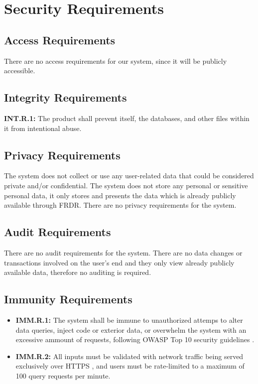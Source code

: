\documentclass[12pt]{article}
\begin{document}
\section{Security Requirements}
\subsection{Access Requirements}

\par{There are no access requirements for our system, since it will be publicly accessible.}

\subsection{Integrity Requirements}

\par{\textbf{INT.R.1:}\label{req:int.r.1} The product shall prevent itself, the databases, and other files within it from intentional abuse.}

\subsection{Privacy Requirements}

\par{The system does not collect or use any user-related data that could be considered private and/or confidential. \newline \indent
The system does not store any personal or sensitive personal data, it only stores and presents the data which is already 
publicly available through FRDR. \newline \indent There are no privacy requirements for the system.}

\subsection{Audit Requirements}

\par{There are no audit requirements for the system. There are no data changes or transactions involved on the user's end 
and they only view already publicly available data, therefore no auditing is required.}

\subsection{Immunity Requirements}

\begin{itemize}
    \item \textbf{IMM.R.1:}\label{req:imm.r.1} The system shall be immune to unauthorized attemps to alter data queries, inject code or exterior data, or overwhelm 
the system with an excessive ammount of requests, following OWASP Top 10 security guidelines \cite{OWASPTop10}. 
    \item \textbf{IMM.R.2:}\label{req:imm.r.2} All inputs must be validated with network traffic being served exclusively over HTTPS \cite{HTTPSecurity2023}, 
and users must be rate-limited to a maximum of 100 query requests per minute.
\end{itemize}
\end{document}
